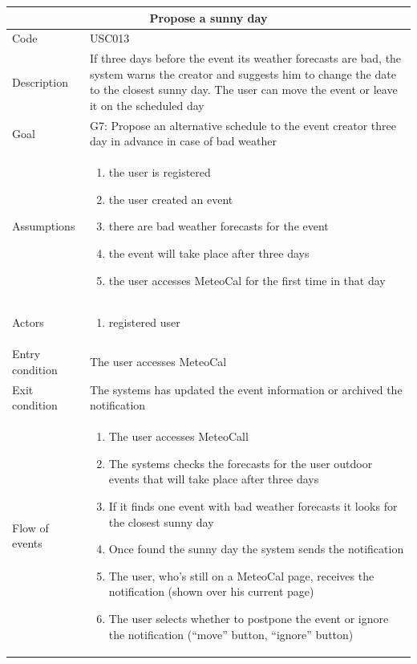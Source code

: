\documentclass[10pt,a4paper,titlepage]{article}
\begin{document}
\begin{longtable}[h]{| p{3cm} | p{10cm} |} 
\hline \multicolumn{2}{|c|}{\textbf{Propose a sunny day}} \\  
\hline Code & USC013 \\  
\hline Description & If three days before the event its weather forecasts are bad, the system warns the creator and suggests him to change the date to the closest sunny day. The user can move the event or leave it on the scheduled day\\ 
\hline Goal & G7: Propose an alternative schedule to the event creator three day in advance in case of bad weather\\ 
\hline Assumptions  & \begin{enumerate} 
\item the user is registered 
\item the user created an event
\item there are bad weather forecasts for the event
\item the event will take place after three days
\item the user accesses MeteoCal for the first time in that day
\end{enumerate} \\ 
\hline Actors &  \begin{enumerate} 
\item registered user 
\end{enumerate} \\ 
\hline Entry condition & The user accesses MeteoCal\\ 
\hline Exit condition & The systems has updated the event information or archived the notification\\ 
\hline Flow of events & \begin{enumerate} 
\item The user accesses MeteoCall
\item The systems checks the forecasts for the user outdoor events that will take place after three days
\item If it finds one event with bad weather forecasts it looks for the closest sunny day
\item Once found the sunny day the system sends the notification
\item The user, who's still on a MeteoCal page, receives the notification (shown over his current page)
\item The user selects whether to postpone the event or ignore the notification (“move” button, “ignore” button)

\end{enumerate}
\end{longtable}
\end{document}
